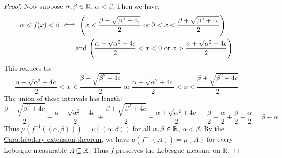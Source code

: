 \documentclass[main.tex]{subfiles}
\begin{document}
\begin{proof}
    Now suppose $\alpha,\beta\in\R$, $\alpha<\beta$. Then we have:
    \begin{align*}
        \alpha<f(x)<\beta
        &\iff \qty(x<\frac{\beta-\sqrt{\beta^2+4c}}{2} \text{ or } 0<x<\frac{\beta+\sqrt{\beta^2+4c}}{2}) \\
        &\qquad \text{ and }\qty(\frac{\alpha-\sqrt{\alpha^2+4c}}{2}<x<0 \text{ or } x>\frac{\alpha+\sqrt{\alpha^2+4c}}{2})
    \end{align*}
    This reduces to:
    \begin{equation*}
        \frac{\alpha-\sqrt{\alpha^2+4c}}{2}<x<\frac{\beta-\sqrt{\beta^2+4c}}{2}
        \text{ or }
        \frac{\alpha+\sqrt{\alpha^2+4c}}{2}<x<\frac{\beta+\sqrt{\beta^2+4c}}{2}
    \end{equation*}
    The union of these intervals has length:
    \begin{equation*}
        \frac{\beta-\sqrt{\beta^2+4c}}{2}-\frac{\alpha-\sqrt{\alpha^2+4c}}{2}+\frac{\beta+\sqrt{\beta^2+4c}}{2}-\frac{\alpha+\sqrt{\alpha^2+4c}}{2}
        = \frac{\beta}{2}-\frac{\alpha}{2}+\frac{\beta}{2}-\frac{\alpha}{2}
        = \beta-\alpha
    \end{equation*}
    Thus $\mu(f^{-1}((\alpha,\beta)))=\mu((\alpha,\beta))$ for all $\alpha,\beta\in\R$, $\alpha<\beta$. By the \href{https://en.wikipedia.org/wiki/Carath%C3%A9odory%27s_extension_theorem}{Carathéodory extension theorem}, we have $\mu(f^{-1}(A))=\mu(A)$ for every Lebesgue measurable $A\sub\R$. Thus $f$ preserves the Lebesgue measure on $\R$.
\end{proof}
\end{document}
